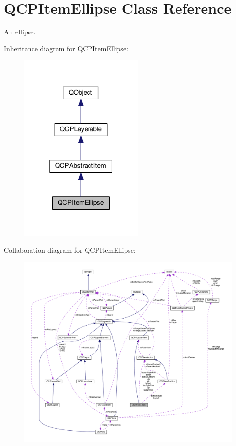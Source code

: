 \hypertarget{classQCPItemEllipse}{}\section{Q\+C\+P\+Item\+Ellipse Class Reference}
\label{classQCPItemEllipse}


An ellipse.  




Inheritance diagram for Q\+C\+P\+Item\+Ellipse\+:
\nopagebreak
\begin{figure}[H]
\begin{center}
\leavevmode
\includegraphics[width=175pt]{classQCPItemEllipse__inherit__graph}
\end{center}
\end{figure}


Collaboration diagram for Q\+C\+P\+Item\+Ellipse\+:
\nopagebreak
\begin{figure}[H]
\begin{center}
\leavevmode
\includegraphics[width=350pt]{classQCPItemEllipse__coll__graph}
\end{center}
\end{figure}
